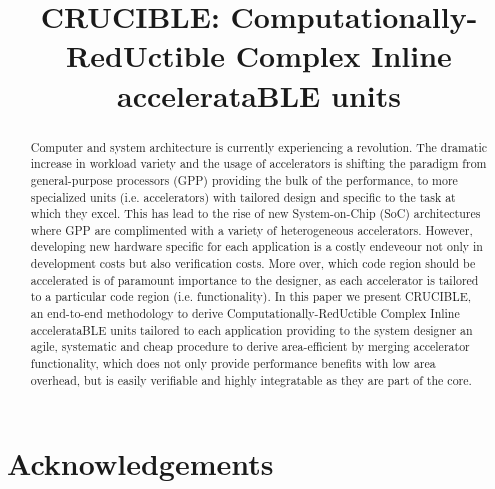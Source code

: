 \documentclass{sig-alternate}
\title{CRUCIBLE: Computationally-RedUctible Complex Inline accelerataBLE units}
\begin{document}
\maketitle
\thispagestyle{firstpage}
\pagestyle{plain}




\begin{abstract}

Computer and system architecture is currently experiencing a revolution. The dramatic
increase in workload variety and the usage of accelerators is shifting the paradigm from general-purpose
processors (GPP) providing the bulk of the performance, to more specialized units (i.e. accelerators) with tailored
design and specific to the task at which they excel. This has lead to the rise of new System-on-Chip (SoC) architectures
where GPP are complimented with a variety of heterogeneous accelerators. However, developing new hardware specific
for each application is a costly endeveour not only in development costs but also verification costs. More over, which
code region should be accelerated is of paramount importance to the designer, as each accelerator is tailored to a particular code region (i.e. functionality).
In this paper we present CRUCIBLE, an end-to-end methodology to derive Computationally-RedUctible Complex Inline accelerataBLE units
tailored to each application providing to the system designer an agile, systematic and cheap procedure to derive area-efficient by merging 
accelerator functionality, which does not only provide performance benefits with low area overhead, but is easily verifiable and highly integratable as they 
are part of the core.

\end{abstract}






\section{Acknowledgements}






\end{document}
